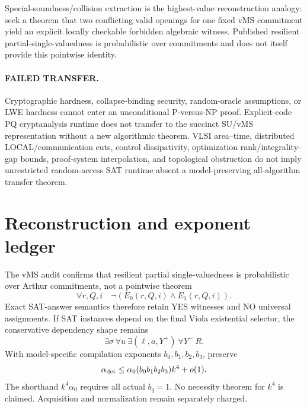 \documentclass[11pt]{article}
\begin{document}
Special-soundness/collision extraction is the highest-value reconstruction analogy: seek a theorem that two conflicting valid openings for one fixed vMS commitment yield an explicit locally checkable forbidden algebraic witness. Published resilient partial-single-valuedness is probabilistic over commitments and does not itself provide this pointwise identity.

\paragraph{FAILED TRANSFER.}
Cryptographic hardness, collapse-binding security, random-oracle assumptions, or LWE hardness cannot enter an unconditional P-versus-NP proof. Explicit-code PQ cryptanalysis runtime does not transfer to the succinct SU/vMS representation without a new algorithmic theorem. VLSI area--time, distributed LOCAL/communication cuts, control dissipativity, optimization rank/integrality-gap bounds, proof-system interpolation, and topological obstruction do not imply unrestricted random-access SAT runtime absent a model-preserving all-algorithm transfer theorem.

\section*{Reconstruction and exponent ledger}
The vMS audit confirms that resilient partial single-valuedness is probabilistic over Arthur commitments, not a pointwise theorem
\[
\forall r,Q,i\quad\neg(E_0(r,Q,i)\wedge E_1(r,Q,i)).
\]
Exact SAT-answer semantics therefore retain YES witnesses and NO universal assignments. If SAT instances depend on the final Viola existential selector, the conservative dependency shape remains
\[
\exists\sigma\ \forall u\ \exists(\ell,a,Y^+)\ \forall Y^-\ R.
\]
With model-specific compilation exponents \(b_0,b_1,b_2,b_3\), preserve
\[
\alpha_{\rm det}\le \alpha_0(b_0b_1b_2b_3)k^4+o(1).
\]
The shorthand \(k^4\alpha_0\) requires all actual \(b_q=1\). No necessity theorem for \(k^4\) is claimed. Acquisition and normalization remain separately charged.
\end{document}
